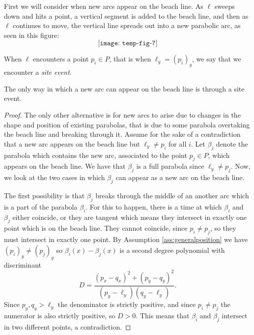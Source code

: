 First we will consider when new arcs appear on the beach line. As $\ell$ sweeps down and hits a point, a vertical segment is added to the beach line, and then as $\ell$ continues to move, the vertical line spreads out into a new parabolic arc, as seen in this figure:
\[
    \texttt{[image: temp-fig-7]}
\]
\begin{defn}
When $\ell$ encounters a point $p_i \in P$, that is when $\ell_y = (p_i)_y$, we say that we encounter a \emph{site event}.
\end{defn}
\begin{lem} \label{lem:newarciffsiteevent}
The only way in which a new arc can appear on the beach line is through a site event.
\end{lem}
\begin{proof}
The only other alternative is for new arcs to arise due to changes in the shape and position of existing parabolas, that is due to some parabola overtaking the beach line and breaking through it. Assume for the sake of a contradiction that a new arc appears on the beach line but $\ell_y \ne p_i$ for all $i$. Let $\beta_j$ denote the parabola which contains the new arc, associated to the point $p_j \in P$, which appears on the beach line. We have that $\beta_j$ is a full parabola since $\ell_y \ne p_j$. Now, we look at the two cases in which $\beta_j$ can appear as a new arc on the beach line.

The first possibility is that $\beta_j$ breaks through the middle of an another arc which is a part of the parabola $\beta_i$. For this to happen, there is a time at which $\beta_i$ and $\beta_j$ either coincide, or they are tangent which means they intersect in exactly one point which is on the beach line. They cannot coincide, since $p_i \ne p_j$, so they must intersect in exactly one point. By Assumption \ref{ass:generalposition} we have $(p_i)_y \ne (p_j)_y$ so $\beta_i(x) - \beta_j(x)$ is a second degree polynomial with discriminant
\begin{equation}
    D = \frac{(p_x - q_x)^2 + (p_y - q_y)^2}{(p_y - \ell_y)(q_y - \ell_y)}.
\end{equation}
Since $p_y, q_y > \ell_y$ the denominator is strictly positive, and since $p_i \ne p_j$ the numerator is also strictly positive, so $D > 0$. This means that $\beta_i$ and $\beta_j$ intersect in two different points, a contradiction.


\end{proof}
